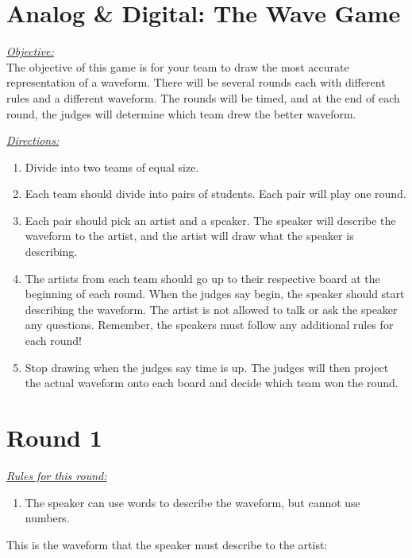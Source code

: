 \documentclass[12pt]{article}
\newcommand{\ben}{\begin{enumerate}}
\newcommand{\een}{\end{enumerate}}
\begin{document}
\section*{Analog \& Digital: The Wave Game}

\underline{\textit{Objective:}} \\
\doublespace
The objective of this game is for your team to draw the most accurate representation of a waveform. There will be several rounds each with different rules and a different waveform. The rounds will be timed, and at the end of each round, the judges will determine which team drew the better waveform.
\singlespace

\vspace{5mm}

\underline{\textit{Directions:}}
\ben
	\item{Divide into two teams of equal size.}
	\item{Each team should divide into pairs of students. Each pair will play one round.}
	\item{Each pair should pick an artist and a speaker. The speaker will describe the waveform to the artist, and the artist will draw what the speaker is describing.}
	\item{The artists from each team should go up to their respective board at the beginning of each round. When the judges say begin, the speaker should start describing the waveform. The artist is not allowed to talk or ask the speaker any questions. Remember, the speakers must follow any additional rules for each round!}
	\item{Stop drawing when the judges say time is up. The judges will then project the actual waveform onto each board and decide which team won the round.}
\een

\newpage
\section*{Round 1}
\vspace{5mm}
\underline{\textit{Rules for this round:}}
\ben
	\item{The speaker can use words to describe the waveform, but cannot use numbers.}
\een
\vspace{20mm}
This is the waveform that the speaker must describe to the artist:

\newpage
\end{document}
